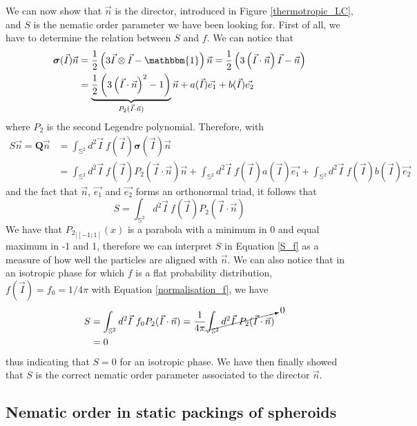 \documentclass[class=article, float=false, crop=false]{standalone}
\begin{document}
We can now show that $\vec{n}$ is the director, introduced in Figure \ref{thermotropic_LC}, and $S$ is the nematic order parameter we have been looking for. First of all, we have to determine the relation between $S$ and $f$. We can notice that
\begin{align*}
\bm{\sigma}(\vec{I})\vec{n} &= \frac{1}{2}\left(3\vec{I}\otimes\vec{I}-\mathbbm{1}\right)\vec{n} = \frac{1}{2}\left(3\left(\vec{I}\cdot\vec{n}\right)\vec{I} - \vec{n}\right)\\
&= \underbrace{\frac{1}{2}\left(3\left(\vec{I}\cdot\vec{n}\right)^2 - 1\right)}_{P_2(\vec{I}\cdot\vec{n})}\vec{n} + a(\vec{I}) \vec{e_1} + b(\vec{I})\vec{e_2} 
\end{align*}
where $P_2$ is the second Legendre polynomial. Therefore, with
\begin{align*}
S\vec{n} = \bm{Q}\vec{n} &= \int_{\mathbb{S}^2} d^2\vec{I}~ f(\vec{I}) \bm{\sigma}(\vec{I})\vec{n}\\
&= \int_{\mathbb{S}^2} d^2\vec{I}~ f(\vec{I}) P_2(\vec{I}\cdot\vec{n})\vec{n} + \int_{\mathbb{S}^2} d^2\vec{I}~ f(\vec{I}) a(\vec{I}) \vec{e_1} + \int_{\mathbb{S}^2} d^2\vec{I}~ f(\vec{I}) b(\vec{I}) \vec{e_2}
\end{align*}
and the fact that $\vec{n}$, $\vec{e_1}$ and $\vec{e_2}$ forms an orthonormal triad, it follows that
\begin{equation}
S = \int_{\mathbb{S}^2} d^2\vec{I}~ f(\vec{I}) P_2(\vec{I}\cdot\vec{n})
\label{S_f}
\end{equation}
We have that ${P_2}_{|[-1;1]}(x)$ is a parabola with a minimum in 0 and equal maximum in -1 and 1, therefore we can interpret $S$ in Equation \ref{S_f} as a measure of how well the particles are aligned with $\vec{n}$. We can also notice that in an isotropic phase for which $f$ is a flat probability distribution, $f(\vec{I}) = f_0 = 1/4\pi$ with Equation \ref{normalisation_f}, we have
\begin{align*}
S &= \int_{\mathbb{S}^2} d^2\vec{I}~ f_0 P_2(\vec{I}\cdot\vec{n}) = \frac{1}{4\pi} \cancelto{0}{\int_{\mathbb{S}^2} d^2\vec{I}~ P_2(\vec{I}\cdot\vec{n})}\\
&= 0
\end{align*}
thus indicating that $S=0$ for an isotropic phase. We have then finally showed that $S$ is the correct nematic order parameter associated to the director $\vec{n}$.

\subsection{Nematic order in static packings of spheroids}
\end{document}
